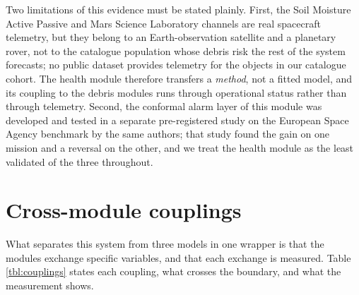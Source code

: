 \documentclass[3p,times]{elsarticle}
\begin{document}
Two limitations of this evidence must be stated plainly. First, the Soil
Moisture Active Passive and Mars Science Laboratory channels are real
spacecraft telemetry, but they belong to an Earth-observation satellite
and a planetary rover, not to the catalogue population whose debris risk
the rest of the system forecasts; no public dataset provides telemetry
for the objects in our catalogue cohort. The health module therefore
transfers a \emph{method}, not a fitted model, and its coupling to the
debris modules runs through operational status rather than through
telemetry. Second, the conformal alarm layer of this module was
developed and tested in a separate pre-registered study on the European
Space Agency benchmark \citep{kotowski2026esaadb} by the same authors;
that study found the gain on one mission and a reversal on the other,
and we treat the health module as the least validated of the three
throughout.

\section{Cross-module couplings}\label{sec:couplings}

What separates this system from three models in one wrapper is that the
modules exchange specific variables, and that each exchange is measured.
Table \ref{tbl:couplings} states each coupling, what crosses the
boundary, and what the measurement shows.
\end{document}
